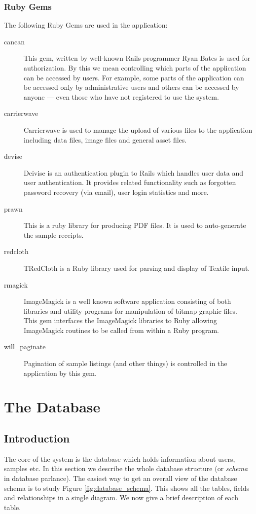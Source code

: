 \documentclass[12pt,twoside]{article}
\begin{document}
\subsubsection{Ruby Gems}
The following Ruby Gems are used in the application:
\begin{description}
\item[cancan\cite{cancan}]
This gem, written by well-known Rails programmer Ryan Bates is used for
authorization. By this we mean controlling which parts of the application
can be accessed by users. For example, some parts of the application can
be accessed only by administrative users and others can be accessed by
anyone --- even those who have not registered to use the system.
\item[carrierwave\cite{carrierwave}]
Carrierwave is used to manage the upload of various files to the application
including data files, image files and general asset files.
\item[devise\cite{devise}]
Deivise is an authentication plugin to Rails which handles user data and
user authentication. It provides related functionality such as forgotten
password recovery (via email), user login statistics and more.
\item[prawn\cite{prawn}]
This is a ruby library for producing PDF files. It is used to
auto-generate the sample receipts.
\item[redcloth\cite{redcloth}]
TRedCloth is a Ruby library used for parsing and display of Textile input.
\item[rmagick\cite{rmagick}]
ImageMagick is a well known software application consisting of both
libraries and utility programs for manipulation of bitmap graphic files.
This gem interfaces the ImageMagick libraries to Ruby allowing
ImageMagick routines to be called from within a Ruby program.
\item[will\_paginate\cite{willp}]
Pagination of sample listings (and other things) is controlled in the
application by this gem.
\end{description}

\section{The Database}\label{sec:database}
\subsection{Introduction}
The core of the system is the database which holds information about 
users, samples etc. In this section we describe the whole database
structure (or \emph{schema} in database parlance).
The easiest way to get an overall view of the database schema is to
study Figure \ref{fig:database_schema}. This shows
all the tables, fields and relationships in a single diagram.
We now give a brief description of each table.
\end{document}
